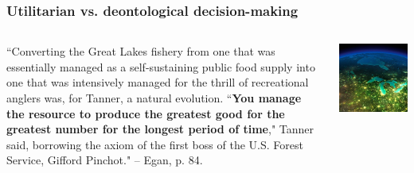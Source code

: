 \documentclass[aspectratio=169]{beamer}
\theoremstyle{principle}
\begin{document}
\begin{frame}
\frametitle{Utilitarian vs. deontological decision-making}
\begin{columns}
\begin{column}{0.5\textwidth}

``Converting the Great Lakes fishery from one that was essentially managed as a self-sustaining public food supply into one that was intensively managed for the thrill of recreational anglers was, for Tanner, a natural evolution.  ``\textbf{You manage the resource to produce the greatest good for the greatest number for the longest period of time}," Tanner said, borrowing the axiom of the first boss of the U.S. Forest Service, Gifford Pinchot." -- Egan, p. 84.

\end{column}
\begin{column}{0.5\textwidth}
\includegraphics[scale=0.3]{great_lakes.jpg}
\end{column}
\end{columns}


\end{frame}
\end{document}

